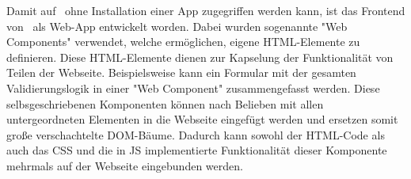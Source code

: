 \label{sec:webcomponents}

Damit auf \ZELIA\ ohne Installation einer App zugegriffen werden kann, ist das Frontend von \ZELIA\ als Web-App entwickelt worden. 
Dabei wurden sogenannte "Web Components" verwendet, welche ermöglichen, eigene HTML-Elemente zu definieren. 
Diese HTML-Elemente dienen zur Kapselung der Funktionalität von Teilen der Webseite.
Beispielsweise kann ein Formular mit der gesamten Validierungslogik in einer "Web Component" zusammengefasst werden.
Diese selbsgeschriebenen Komponenten können nach Belieben mit allen untergeordneten Elementen in die Webseite eingefügt werden und ersetzen somit große verschachtelte DOM-Bäume.
Dadurch kann sowohl der HTML-Code als auch das CSS und die in JS implementierte Funktionalität dieser Komponente mehrmals auf der Webseite eingebunden werden. \cite{MDNWebCustomElements}


\pagebreak

